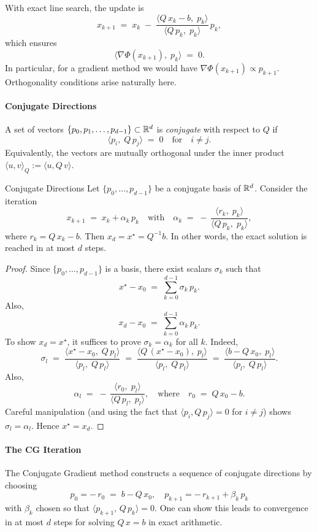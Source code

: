 With exact line search, the update is
\[
x_{k+1} 
\;=\; x_k \;-\; \frac{\langle Q\,x_k - b,\;p_k\rangle}{\langle Q\,p_k,\;p_k\rangle}\,p_k,
\]
which ensures 
\[
\langle \nabla \Phi(x_{k+1}),\;p_k\rangle \;=\; 0.
\]
In particular, for a gradient method we would have \(\nabla \Phi(x_{k+1}) \propto p_{k+1}\). Orthogonality conditions arise naturally here.

\paragraph{Conjugate Directions}
A set of vectors \(\{p_0, p_1, \dots, p_{d-1}\}\subset \mathbb{R}^d\) is \emph{conjugate} with respect to \(Q\) if
\[
    \langle p_i,\;Q\,p_j\rangle \;=\; 0 \quad\text{for}\quad i\neq j.
\]
Equivalently, the vectors are mutually orthogonal under the inner product \(\langle u, v \rangle_Q := \langle u, Q\,v\rangle\).

\begin{lemma}{Conjugate Directions}{}
    Let \(\{p_0,\ldots,p_{d-1}\}\) be a conjugate basis of \(\mathbb{R}^d\). Consider the iteration
    \[
    x_{k+1} \;=\; x_k + \alpha_k\,p_k
    \quad\text{with}\quad
    \alpha_k \;=\; -\,\frac{\langle r_k,\;p_k\rangle}{\langle Q\,p_k,\;p_k\rangle},
    \]
    where \(r_k = Q\,x_k - b\). Then \(x_d = x^\star = Q^{-1}b\). In other words, the exact solution is reached in at most \(d\) steps.
\end{lemma}

\begin{proof}{}{}
Since \(\{p_0,\ldots,p_{d-1}\}\) is a basis, there exist scalars \(\sigma_k\) such that
\[
x^\star - x_0 
\;=\; \sum_{k=0}^{d-1} \sigma_k\,p_k.
\]
Also,
\[
x_d - x_0 
\;=\; \sum_{k=0}^{d-1} \alpha_k\,p_k.
\]
To show \(x_d = x^\star\), it suffices to prove \(\sigma_k = \alpha_k\) for all \(k\). Indeed,
\[
    \sigma_l 
    \;=\; \frac{\langle x^\star - x_0,\;Q\,p_l\rangle}{\langle p_l,\;Q\,p_l\rangle}
    \;=\; \frac{\langle Q\,(x^\star - x_0),\;p_l\rangle}{\langle p_l,\;Q\,p_l\rangle}
    \;=\; \frac{\langle b - Q\,x_0,\;p_l\rangle}{\langle p_l,\;Q\,p_l\rangle}.
\]
Also,
\[
    \alpha_l
    \;=\; -\,\frac{\langle r_0,\;p_l\rangle}{\langle Q\,p_l,\;p_l\rangle},
    \quad\text{where}\quad r_0 \;=\; Q\,x_0 - b.
\]
Careful manipulation (and using the fact that \(\langle p_i, Q\,p_j\rangle=0\) for \(i\neq j\)) shows \(\sigma_l = \alpha_l\). Hence \(x^\star = x_d\).
\end{proof}

\paragraph{The CG Iteration}
The Conjugate Gradient method constructs a sequence of conjugate directions by choosing
\[
p_0 = -\,r_0 \;=\; b - Q\,x_0,
\quad
p_{k+1} = -\,r_{k+1} + \beta_k\,p_k
\]
with \(\beta_k\) chosen so that \(\langle p_{k+1},\,Q\,p_k\rangle=0\). One can show this leads to convergence in at most \(d\) steps for solving \(Q\,x = b\) in exact arithmetic.


